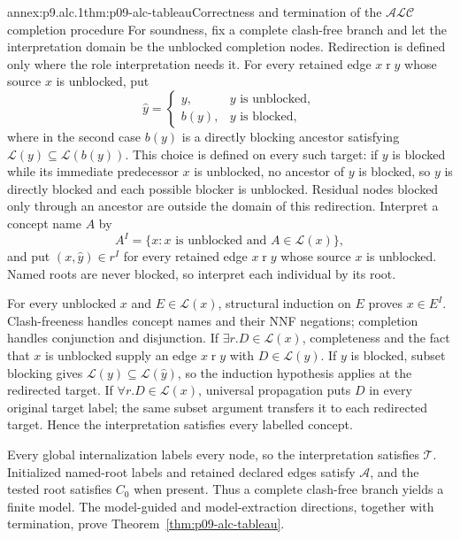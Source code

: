 \begin{annexitem}{annex:p9.alc.1}{thm:p09-alc-tableau}{Correctness and termination of the \(\mathcal{ALC}\) completion procedure}
For soundness, fix a complete clash-free branch and let the interpretation
domain be the unblocked completion nodes.  Redirection is defined only where
the role interpretation needs it.  For every retained edge
\(x\mathrel r y\) whose source \(x\) is unblocked, put
\[
 \widehat y=
 \begin{cases}
  y,&y\text{ is unblocked},\\
  b(y),&y\text{ is blocked},
 \end{cases}
\]
where in the second case \(b(y)\) is a directly blocking ancestor satisfying
\(\mathcal L(y)\subseteq\mathcal L(b(y))\).  This choice is defined on every
such target: if \(y\) is blocked while its immediate predecessor \(x\) is
unblocked, no ancestor of \(y\) is blocked, so \(y\) is directly blocked and
each possible blocker is unblocked.  Residual nodes blocked only through an
ancestor are outside the domain of this redirection.  Interpret a concept name
\(A\) by
\[
 A^I=\{x:x\text{ is unblocked and }A\in\mathcal L(x)\},
\]
and put \((x,\widehat y)\in r^I\) for every retained edge \(x\mathrel r y\) whose
source \(x\) is unblocked.  Named roots are never blocked, so interpret each
individual by its root.

For every unblocked \(x\) and \(E\in\mathcal L(x)\), structural induction on
\(E\) proves \(x\in E^I\).  Clash-freeness handles concept names and their NNF
negations; completion handles conjunction and disjunction.  If
\(\exists r.D\in\mathcal L(x)\), completeness and the fact that \(x\) is
unblocked supply an edge \(x\mathrel r y\) with
\(D\in\mathcal L(y)\).  If \(y\) is blocked, subset blocking gives
\(\mathcal L(y)\subseteq\mathcal L(\widehat y)\), so the induction hypothesis applies
at the redirected target.  If \(\forall r.D\in\mathcal L(x)\), universal
propagation puts \(D\) in every original target label; the same subset argument
transfers it to each redirected target.  Hence the interpretation satisfies
every labelled concept.

Every global internalization labels every node, so the interpretation satisfies
\(\mathcal T\).  Initialized named-root labels and retained declared edges
satisfy \(\mathcal A\), and the tested root satisfies \(C_0\) when present.
Thus a complete clash-free branch yields a finite model.  The model-guided and
model-extraction directions, together with termination, prove
Theorem~\ref{thm:p09-alc-tableau}.
\end{annexitem}

